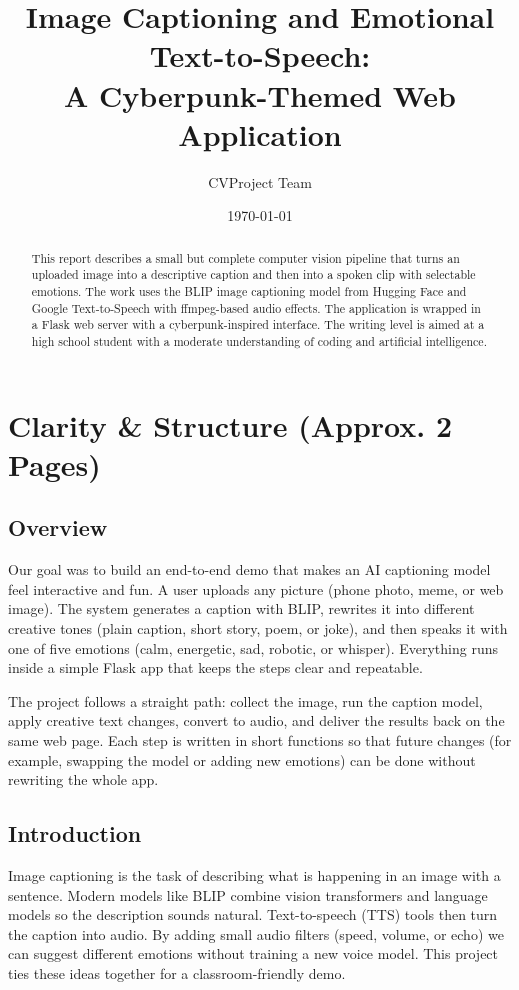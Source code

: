\documentclass[11pt]{article}
\title{Image Captioning and Emotional Text-to-Speech:\\A Cyberpunk-Themed Web Application}
\author{CVProject Team}
\date{\today}
\begin{document}
\maketitle

\begin{abstract}
This report describes a small but complete computer vision pipeline that turns an uploaded image into a descriptive caption and then into a spoken clip with selectable emotions. The work uses the BLIP image captioning model from Hugging Face and Google Text-to-Speech with ffmpeg-based audio effects. The application is wrapped in a Flask web server with a cyberpunk-inspired interface. The writing level is aimed at a high school student with a moderate understanding of coding and artificial intelligence.
\end{abstract}

\section{Clarity \& Structure (Approx. 2 Pages)}
\subsection{Overview}
Our goal was to build an end-to-end demo that makes an AI captioning model feel interactive and fun. A user uploads any picture (phone photo, meme, or web image). The system generates a caption with BLIP, rewrites it into different creative tones (plain caption, short story, poem, or joke), and then speaks it with one of five emotions (calm, energetic, sad, robotic, or whisper). Everything runs inside a simple Flask app that keeps the steps clear and repeatable.

The project follows a straight path: collect the image, run the caption model, apply creative text changes, convert to audio, and deliver the results back on the same web page. Each step is written in short functions so that future changes (for example, swapping the model or adding new emotions) can be done without rewriting the whole app.

\subsection{Introduction}
Image captioning is the task of describing what is happening in an image with a sentence. Modern models like BLIP combine vision transformers and language models so the description sounds natural. Text-to-speech (TTS) tools then turn the caption into audio. By adding small audio filters (speed, volume, or echo) we can suggest different emotions without training a new voice model. This project ties these ideas together for a classroom-friendly demo.
\end{document}
